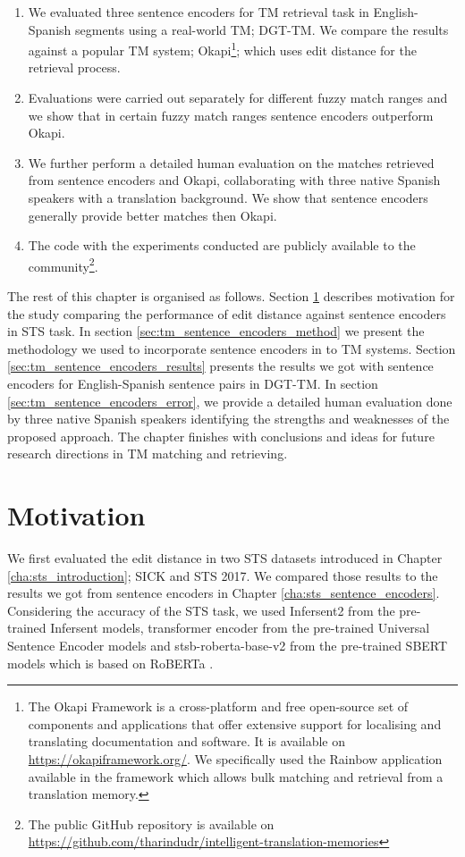 \begin{enumerate}
	\item We evaluated three sentence encoders for TM retrieval task in English-Spanish segments using a real-world TM; DGT-TM. We compare the results against a popular TM system; Okapi\footnote{The Okapi Framework is a cross-platform and free open-source set of components and applications that offer extensive support for localising and translating documentation and software. It is available on \url{https://okapiframework.org/}. We specifically used the Rainbow application available in the framework which allows bulk matching and retrieval from a translation memory.}; which uses edit distance for the retrieval process.
	
	\item Evaluations were carried out separately for different fuzzy match ranges and we show that in certain fuzzy match ranges sentence encoders outperform Okapi.
	
	\item We further perform a detailed human evaluation on the matches retrieved from sentence encoders and Okapi, collaborating with three native Spanish speakers with a translation background. We show that sentence encoders generally provide better matches then Okapi.
	
	\item The code with the experiments conducted are publicly available to the community\footnote{The public GitHub repository is available on \url{https://github.com/tharindudr/intelligent-translation-memories}}.
\end{enumerate}

The rest of this chapter is organised as follows. Section \ref{sec:tm_sentence_encoders_motivation} describes motivation for the study comparing the performance of edit distance against sentence encoders in STS task. In section \ref{sec:tm_sentence_encoders_method} we present the methodology we used to incorporate sentence encoders in to TM systems. Section \ref{sec:tm_sentence_encoders_results} presents the results we got with sentence encoders for English-Spanish sentence pairs in DGT-TM. In section \ref{sec:tm_sentence_encoders_error}, we provide a detailed human evaluation done by three native Spanish speakers identifying the strengths and weaknesses of the proposed approach. The chapter finishes with conclusions and ideas for future research directions in TM matching and retrieving.


\section{Motivation}
\label{sec:tm_sentence_encoders_motivation}
We first evaluated the edit distance in two STS datasets introduced in Chapter \ref{cha:sts_introduction}; SICK and STS 2017. We compared those results to the results we got from sentence encoders in Chapter \ref{cha:sts_sentence_encoders}. Considering the accuracy of the STS task, we used Infersent2 from the pre-trained Infersent models, transformer encoder from the pre-trained Universal Sentence Encoder models and stsb-roberta-base-v2 from the pre-trained SBERT models which is based on RoBERTa \cite{liu2019roberta}. 

